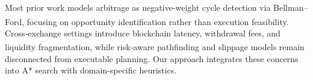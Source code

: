 Most prior work models arbitrage as negative-weight cycle detection via Bellman--Ford\textsuperscript{\cite{bellman1958routing,cormen2009introduction,oanta2023crypto,defiposer2021,mmbf2024,rich2025,fang2022cryptocurrency}}, focusing on opportunity identification rather than execution feasibility. Cross-exchange settings introduce blockchain latency, withdrawal fees, and liquidity fragmentation\textsuperscript{\cite{obadia2021flashbots,optimalexecution2024}}, while risk-aware pathfinding\textsuperscript{\cite{nikolova2008stochastic,lim2022cvar}} and slippage models\textsuperscript{\cite{almgren2001optimal}} remain disconnected from executable planning. Our approach integrates these concerns into A* search with domain-specific heuristics.
